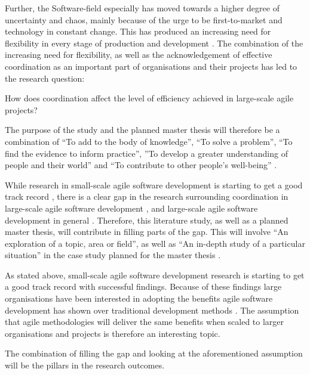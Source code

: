 Further, the Software-field especially has moved towards a higher degree of uncertainty and chaos, mainly because of the urge to be first-to-market and technology in constant change. This has produced an increasing need for flexibility in every stage of production and development \cite{Pikkarainen2008, Beck2004, Borjesson2004}. The combination of the increasing need for flexibility, as well as the acknowledgement of effective coordination as an important part of organisations and their projects has led to the research question:

\begin{fancyquotes}
How does coordination affect the level of efficiency achieved in large-scale agile projects?
\end{fancyquotes}


The purpose of the study and the planned master thesis will therefore be a combination of ``To add to the body of knowledge'', ``To solve a problem'', ``To find the evidence to inform practice'', ''To develop a greater understanding of people and their world'' and ``To contribute to other people's well-being'' \cite{Oates2006}.

While research in small-scale agile software development is starting to get a good track record \cite{Paasivaara2012, Haaster2014}, there is a clear gap in the research surrounding coordination in large-scale agile software development \cite{Pikkarainen2008, Paasivaara2012, Dingsoyr2013b}, and large-scale agile software development in general \cite{Freudenberg2010, Haaster2014}. Therefore, this literature study, as well as a planned master thesis, will contribute in filling parts of the gap. This will involve ``An exploration of a topic, area or field'', as well as ``An in-depth study of a particular situation'' in the case study planned for the master thesis \cite{Oates2006}.

As stated above, small-scale agile software development research is starting to get a good track record with successful findings. Because of these findings large organisations have been interested in adopting the benefits agile software development has shown over traditional development methods \cite{Com2013, Vlietland2015, Agerfalk2006, Paasivaara2012}. The assumption that agile methodologies will deliver the same benefits when scaled to larger organisations and projects is therefore an interesting topic.

The combination of filling the gap and looking at the aforementioned assumption will be the pillars in the research outcomes.

